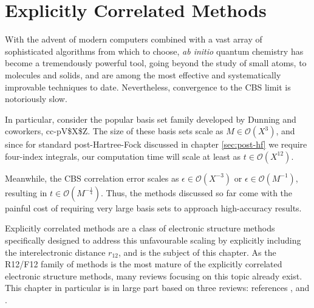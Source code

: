 \chapter{Explicitly Correlated Methods}
\label{chap:explicit}


With the advent of modern computers combined with a vast array of sophisticated algorithms from which to choose, \emph{ab initio} quantum chemistry has become a tremendously powerful tool, going beyond the study of small atoms, to molecules and solids, and are among the most effective and systematically improvable techniques to date. Nevertheless, convergence to the \gls{CBS} limit is notoriously slow.

In particular, consider the popular basis set family developed by Dunning and coworkers, \gls{cc-pV$X$Z}.\cite{dunningGaussian1989a,woonGaussian1993,woonGaussian1994,petersonBenchmark1994,wilsonGaussian1996}
The size of these basis sets scale as $M\in\mathcal{O}(X^3)$, and since for standard post-Hartree-Fock discussed in chapter \ref{sec:post-hf} we require four-index integrals, our computation time will scale at least as $t\in\mathcal{O}(X^{12})$.\cite{klopperR122007}

Meanwhile, the \gls{CBS} correlation error scales as $\epsilon\in\mathcal{O}(X^{-3})$ \cite{helgakerBasisset1997,halkierBasisset1998} or $\epsilon\in\mathcal{O}(M^{-1})$,\cite{klopperInitio1995} resulting in $t\in\mathcal{O}(M^{-\frac 14})$. Thus, the methods discussed so far come with the painful cost of requiring very large basis sets to approach high-accuracy results.

Explicitly correlated methods are a class of electronic structure methods specifically designed to address this unfavourable scaling by explicitly including the interelectronic distance $r_{12}$, and is the subject of this chapter. As the R12/F12 family of methods is the most mature of the explicitly correlated electronic structure methods, many reviews focusing on this topic already exist. This chapter in particular is in large part based on three reviews: references , \cite{klopperR122007} and .


